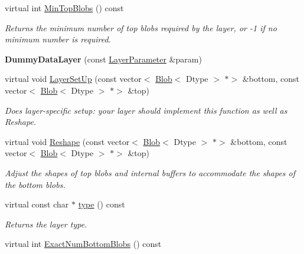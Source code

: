 \begin{DoxyCompactItemize}
virtual int \mbox{\hyperlink{classcaffe_1_1_dummy_data_layer_a2a63e36dd6b39287981d0bee466975aa}{Min\+Top\+Blobs}} () const
\begin{DoxyCompactList}\small\item\em Returns the minimum number of top blobs required by the layer, or -\/1 if no minimum number is required. \end{DoxyCompactList}\item 
\mbox{\label{classcaffe_1_1_dummy_data_layer_a98568bcfa177c5eef82ebd0f50465c78}} 
{\bfseries Dummy\+Data\+Layer} (const \mbox{\hyperlink{classcaffe_1_1_layer_parameter}{Layer\+Parameter}} \&param)
\item 
virtual void \mbox{\hyperlink{classcaffe_1_1_dummy_data_layer_a8bf93d8426b7053bd32de10cc6eb7207}{Layer\+Set\+Up}} (const vector$<$ \mbox{\hyperlink{classcaffe_1_1_blob}{Blob}}$<$ Dtype $>$ $\ast$$>$ \&bottom, const vector$<$ \mbox{\hyperlink{classcaffe_1_1_blob}{Blob}}$<$ Dtype $>$ $\ast$$>$ \&top)
\begin{DoxyCompactList}\small\item\em Does layer-\/specific setup\+: your layer should implement this function as well as Reshape. \end{DoxyCompactList}\item 
virtual void \mbox{\hyperlink{classcaffe_1_1_dummy_data_layer_ae72f2ea80339981bf925f0291f62d527}{Reshape}} (const vector$<$ \mbox{\hyperlink{classcaffe_1_1_blob}{Blob}}$<$ Dtype $>$ $\ast$$>$ \&bottom, const vector$<$ \mbox{\hyperlink{classcaffe_1_1_blob}{Blob}}$<$ Dtype $>$ $\ast$$>$ \&top)
\begin{DoxyCompactList}\small\item\em Adjust the shapes of top blobs and internal buffers to accommodate the shapes of the bottom blobs. \end{DoxyCompactList}\item 
\mbox{\label{classcaffe_1_1_dummy_data_layer_ac41023bacefdb067d6ab153f10e486d4}} 
virtual const char $\ast$ \mbox{\hyperlink{classcaffe_1_1_dummy_data_layer_ac41023bacefdb067d6ab153f10e486d4}{type}} () const
\begin{DoxyCompactList}\small\item\em Returns the layer type. \end{DoxyCompactList}\item 
virtual int \mbox{\hyperlink{classcaffe_1_1_dummy_data_layer_a73101a8ace6de2b179e36c13be17cb17}{Exact\+Num\+Bottom\+Blobs}} () const

\end{DoxyCompactItemize}

